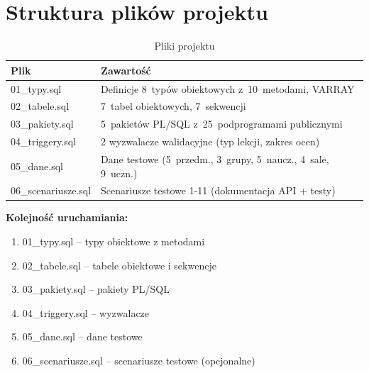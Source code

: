 \documentclass[12pt,a4paper]{article}
\begin{document}
\section{Struktura plików projektu}

\begin{table}[h]
\centering
\begin{tabular}{|l|p{9cm}|}
\hline
\textbf{Plik} & \textbf{Zawartość} \\
\hline
01\_typy.sql & Definicje 8~typów obiektowych z~10~metodami, VARRAY \\
02\_tabele.sql & 7~tabel obiektowych, 7~sekwencji \\
03\_pakiety.sql & 5~pakietów PL/SQL z~25~podprogramami publicznymi \\
04\_triggery.sql & 2 wyzwalacze walidacyjne (typ lekcji, zakres ocen) \\
05\_dane.sql & Dane testowe (5~przedm., 3~grupy, 5~naucz., 4~sale, 9~uczn.) \\
06\_scenariusze.sql & Scenariusze testowe 1-11 (dokumentacja API + testy) \\
\hline
\end{tabular}
\caption{Pliki projektu}
\end{table}

\textbf{Kolejność uruchamiania:}
\begin{enumerate}[nosep]
    \item 01\_typy.sql -- typy obiektowe z metodami
    \item 02\_tabele.sql -- tabele obiektowe i sekwencje
    \item 03\_pakiety.sql -- pakiety PL/SQL
    \item 04\_triggery.sql -- wyzwalacze
    \item 05\_dane.sql -- dane testowe
    \item 06\_scenariusze.sql -- scenariusze testowe (opcjonalne)
\end{enumerate}
\end{document}
